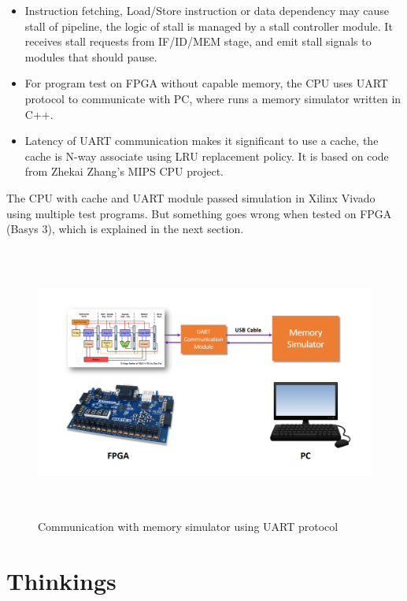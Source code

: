 \documentclass[12pt, a4paper]{article}
\theoremstyle{margin}
\begin{document}
\begin{itemize}
	\item Instruction fetching, Load/Store instruction or data dependency may cause stall of pipeline, the logic of stall is managed by a stall controller module. It receives stall requests from IF/ID/MEM stage, and emit stall signals to modules that should pause.

	\item For program test on FPGA without capable memory, the CPU uses UART protocol to communicate with PC, where runs a memory simulator written in C++.

	\item Latency of UART communication makes it significant to use a cache, the cache is N-way associate using LRU replacement policy. It is based on code from Zhekai Zhang's MIPS CPU project.
\end{itemize}

The CPU with cache and UART module passed simulation in Xilinx Vivado using multiple test programs. But something goes wrong when tested on FPGA (Basys 3), which is explained in the next section.

\begin{figure}[H]
	\begin{center}
	  \includegraphics[height=9cm]{uart-simulate-memory.png}
	\end{center}
	\caption{Communication with memory simulator using UART protocol}
\end{figure}

\section{Thinkings}
\end{document}
